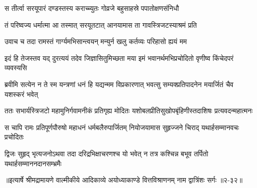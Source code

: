 \twolineshloka
{स तीर्त्वा सरयूपारं दण्डस्तस्य कराच्च्युतः}
{गोव्रजे बहुसाहस्रे पपातोक्षणसंनिधौ} %

\twolineshloka
{तं परिष्वज्य धर्मात्मा आ तस्मात् सरयूतटात्}
{आनयामास ता गावस्त्रिजटस्याश्रमं प्रति} %

\twolineshloka
{उवाच च तदा रामस्तं गार्ग्यमभिसान्त्वयन्}
{मन्युर्न खलु कर्तव्यः परिहासो ह्ययं मम} %

\twolineshloka
{इदं हि तेजस्तव यद् दुरत्ययं तदेव जिज्ञासितुमिच्छता मया}
{इमं भवानर्थमभिप्रचोदितो वृणीष्व किंचेदपरं व्यवस्यसि} %

\twolineshloka
{ब्रवीमि सत्येन न ते स्म यन्त्रणां धनं हि यद्यन्मम विप्रकारणात्}
{भवत्सु सम्यक्प्रतिपादनेन मयार्जितं चैव यशस्करं भवेत्} %

\twolineshloka
{ततः सभार्यस्त्रिजटो महामुनिर्गवामनीकं प्रतिगृह्य मोदितः}
{यशोबलप्रीतिसुखोपबृंहिणीस्तदाशिषः प्रत्यवदन्महात्मनः} %

\twolineshloka
{स चापि रामः प्रतिपूर्णपौरुषो महाधनं धर्मबलैरुपार्जितम्}
{नियोजयामास सुहृज्जने चिराद् यथार्हसम्मानवचः प्रचोदितः} %

\twolineshloka
{द्विजः सुहृद् भृत्यजनोऽथवा तदा दरिद्रभिक्षाचरणश्च यो भवेत्}
{न तत्र कश्चिन्न बभूव तर्पितो यथार्हसम्माननदानसम्भ्रमैः} %


॥इत्यार्षे श्रीमद्रामायणे वाल्मीकीये आदिकाव्ये अयोध्याकाण्डे वित्तविश्राणनम् नाम द्वात्रिंशः सर्गः ॥२-३२॥
